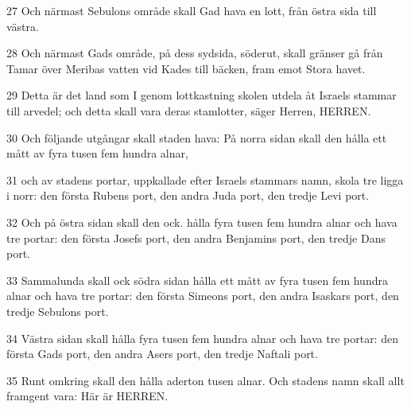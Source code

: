 \par 27 Och närmast Sebulons område skall Gad hava en lott, från östra sida till västra.
\par 28 Och närmast Gads område, på dess sydsida, söderut, skall gränser gå från Tamar över Meribas vatten vid Kades till bäcken, fram emot Stora havet.
\par 29 Detta är det land som I genom lottkastning skolen utdela åt Israels stammar till arvedel; och detta skall vara deras stamlotter, säger Herren, HERREN.
\par 30 Och följande utgångar skall staden hava: På norra sidan skall den hålla ett mått av fyra tusen fem hundra alnar,
\par 31 och av stadens portar, uppkallade efter Israels stammars namn, skola tre ligga i norr: den första Rubens port, den andra Juda port, den tredje Levi port.
\par 32 Och på östra sidan skall den ock. hålla fyra tusen fem hundra alnar och hava tre portar: den första Josefs port, den andra Benjamins port, den tredje Dans port.
\par 33 Sammalunda skall ock södra sidan hålla ett mått av fyra tusen fem hundra alnar och hava tre portar: den första Simeons port, den andra Isaskars port, den tredje Sebulons port.
\par 34 Västra sidan skall hålla fyra tusen fem hundra alnar och hava tre portar: den första Gads port, den andra Asers port, den tredje Naftali port.
\par 35 Runt omkring skall den hålla aderton tusen alnar. Och stadens namn skall allt framgent vara: Här är HERREN.


